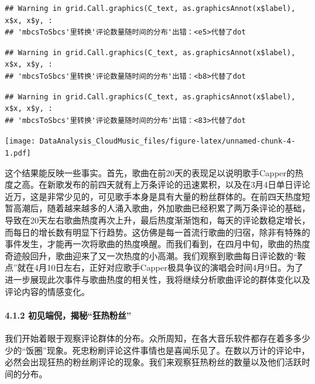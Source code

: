 \documentclass[
]{article}
\newenvironment{Shaded}{\begin{snugshade}}{\end{snugshade}}
\newcommand{\AttributeTok}[1]{\textcolor[rgb]{0.77,0.63,0.00}{#1}}
\newcommand{\CommentTok}[1]{\textcolor[rgb]{0.56,0.35,0.01}{\textit{#1}}}
\newcommand{\ConstantTok}[1]{\textcolor[rgb]{0.00,0.00,0.00}{#1}}
\newcommand{\DecValTok}[1]{\textcolor[rgb]{0.00,0.00,0.81}{#1}}
\newcommand{\FunctionTok}[1]{\textcolor[rgb]{0.00,0.00,0.00}{#1}}
\newcommand{\NormalTok}[1]{#1}
\newcommand{\OtherTok}[1]{\textcolor[rgb]{0.56,0.35,0.01}{#1}}
\newcommand{\SpecialCharTok}[1]{\textcolor[rgb]{0.00,0.00,0.00}{#1}}
\begin{document}
\begin{verbatim}
## Warning in grid.Call.graphics(C_text, as.graphicsAnnot(x$label), x$x, x$y, :
## 'mbcsToSbcs'里转换'评论数量随时间的分布'出错：<e5>代替了dot
\end{verbatim}

\begin{verbatim}
## Warning in grid.Call.graphics(C_text, as.graphicsAnnot(x$label), x$x, x$y, :
## 'mbcsToSbcs'里转换'评论数量随时间的分布'出错：<b8>代替了dot
\end{verbatim}

\begin{verbatim}
## Warning in grid.Call.graphics(C_text, as.graphicsAnnot(x$label), x$x, x$y, :
## 'mbcsToSbcs'里转换'评论数量随时间的分布'出错：<83>代替了dot
\end{verbatim}

\texttt{[image: DataAnalysis\_CloudMusic\_files/figure-latex/unnamed-chunk-4-1.pdf]}

这个结果能反映一些事实。首先，歌曲在前20天的表现足以说明歌手Capper的热度之高。在新歌发布的前四天就有上万条评论的迅速累积，以及在3月4日单日评论近万，这是非常少见的，可见歌手本身是具有大量的粉丝群体的。在前四天热度短暂高潮后，随着越来越多的人涌入歌曲，外加歌曲已经积累了两万条评论的基础，导致在20天左右歌曲热度再次上升，最后热度渐渐饱和，每天的评论数稳定增长，而每日的增长数有明显下行趋势。这仿佛是每一首流行歌曲的归宿，除非有特殊的事件发生，才能再一次将歌曲的热度唤醒。而我们看到，在四月中旬，歌曲的热度奇迹般回升，歌曲迎来了又一次热度的小高潮。我们观察到歌曲每日评论数的``鞍点''就在4月10日左右，正好对应歌手Capper极具争议的演唱会时间4月9日。为了进一步展现此次事件与歌曲热度的相关性，我将继续分析歌曲评论的群体变化以及评论内容的情感变化。

\hypertarget{ux521dux89c1ux7aefux502aux63edux79d8ux72c2ux70edux7c89ux4e1d}{%
\paragraph{4.1.2
初见端倪，揭秘``狂热粉丝''}\label{ux521dux89c1ux7aefux502aux63edux79d8ux72c2ux70edux7c89ux4e1d}}

我们开始着眼于观察评论群体的分布。众所周知，在各大音乐软件都存在着多多少少的``饭圈''现象。死忠粉刷评论这件事情也是喜闻乐见了。在数以万计的评论中，必然会出现狂热的粉丝刷评论的现象。我们来观察狂热粉丝的数量以及他们活跃时间的分布。

\begin{Shaded}
\end{Shaded}
\end{document}
